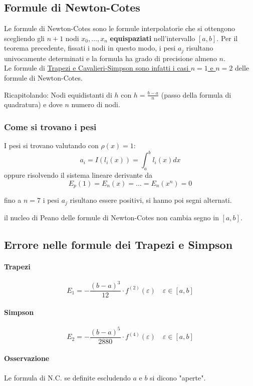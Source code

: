 \documentclass[12pt,a4paper,]{report}
\begin{document}
\subsection{Formule di Newton-Cotes}
\label{sec:formule di newton-cotes}
Le formule di Newton-Cotes sono le formule interpolatorie che si ottengono scegliendo gli $n+1$ nodi $x_0,\dots,x_n$ \textbf{equispaziati} nell'intervallo $[a,b]$. Per il teorema precedente, fissati i nodi in questo modo, i pesi $a_j$ risultano univocamente determinati e la formula ha grado di precisione almeno $n$.\\
Le formule di \uline{Trapezi e Cavalieri-Simpson sono infatti i casi $n=1$ e $n= 2$} delle formule di Newton-Cotes.

Ricapitolando: Nodi equidistanti di $h$ con $h= \frac{b-a}{n}$ (passo della formula di quadratura) e dove $n$ numero di nodi.

\subsubsection{Come si trovano i pesi}
I pesi si trovano valutando con $\rho(x) = 1$:
\[
a_i = I(l_i(x)) = \int_a^b l_i(x)dx
\]
oppure risolvendo il sistema lineare derivante da
\[
E_p(1)=E_n(x)=\dots = E_n(x^n) =0
\]
\begin{nota}
    [Proprietà]
    fino a $n=7$ i pesi $a_j$ risultano essere positivi, si hanno poi segni alternati.
\end{nota}
\begin{nota}
    [Proprietà]
    il nucleo di Peano delle formule di Newton-Cotes non cambia segno in $[a,b]$.
\end{nota}

\subsection{Errore nelle formule dei Trapezi e Simpson}
\paragraph{Trapezi}
\[
E_1 = - \frac{(b-a)^3}{12} \cdot f^{(2)}(\varepsilon) \quad\varepsilon\in [a,b]
\]
\paragraph{Simpson}
\[
E_2 = - \frac{(b-a)^5}{2880} \cdot f^{(4)}(\varepsilon) \quad\varepsilon\in [a,b]
\]
\paragraph{Osservazione}
Le formula di N.C. se definite escludendo $a$ e $b$ si dicono "aperte".
\end{document}
